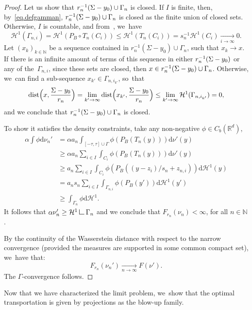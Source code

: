 \documentclass[10pt]{amsart}
\theoremstyle{definition}
\newcommand\LM[1]{\hbox{\vrule width.5pt \vbox to#1pt{\vfill \hrule width#1pt height.5pt}}}
\newcommand\LL{{\mathchoice {\>\LM7\>}{\>\LM7\>}{\,\LM5\,}{\,\LM{3.35}\,}}}
\newcommand{\mres}{\LL}
\newcommand\cH{\mathcal{H}}
\newcommand{\RR}{\mathbb{R}}
\DeclareMathOperator{\dist}{dist}
\newcommand\dd{\mathrm{d}}
\begin{document}
\begin{proof}
Let us show that $r_n^{-1}(\Sigma -\nobreak y_0) \cup\nobreak \Gamma_n$ is closed. If $I$ is finite, then, by~\eqref{eq.defgamman}, $r_n^{-1}(\Sigma -\nobreak y_0) \cup\nobreak \Gamma_n$ is closed as the finite union of closed sets.
Otherwise, $I$ is countable, and from~\cite[Lem.\,2.6]{paolini2013existence}, we~have
\[
\cH^1(\Gamma_{n,i})
=
\cH^1(P_B\circ T_n(C_i))
\le
\cH^1(T_n(C_i))
=
s_n^{-1} \cH^1(C_i)
\xrightarrow[i \to \infty]{} 0.
\]
Let ${\left(x_k\right)}_{k \in \mathbb{N}}$ be a sequence contained in $r_n^{-1}(\Sigma - y_0) \cup \Gamma_n$, such that $x_k \to x$. If there is an infinite amount of terms of this sequence in either $r_n^{-1}(\Sigma -\nobreak y_0)$ or any of the~$\Gamma_{n,i}$, since these sets are closed, then $x \in r_n^{-1}(\Sigma -\nobreak y_0) \cup\nobreak \Gamma_n$. Otherwise, we~can find a sub-sequence $x_{k'} \in \Gamma_{n, i_{k'}}$, so~that
\[
\dist\Bigl(
x, \frac{\Sigma - y_0}{r_n}
\Bigr)
=
\lim_{k' \to \infty}
\dist \Bigl(
x_{k'}, \frac{\Sigma - y_0}{r_n}
\Bigr)
\le
\lim_{k' \to \infty} \cH^1(\Gamma_{n,i_{k'}}) = 0,
\]
and we conclude that $r_n^{-1}(\Sigma -\nobreak y_0) \cup\nobreak \Gamma_n$ is closed.

To show it satisfies the density constraints, take any non-negative $\phi\in C_b(\RR^d)$,
\begin{align*}
\alpha\int\phi\dd \nu_n'
&= \alpha a_n\int_{[-\tau,\tau]\cup \Gamma}\phi\left(P_B(T_n(y))\right)\dd \nu'(y)\\
&\ge \alpha a_n\sum_{i\in I}\int_{C_{i}}\phi\left(P_B(T_n(y))\right)\dd \nu'(y)\\
&\ge a_n\sum_{i\in I}\int_{C_{i}}\phi\left(P_B((y-z_{i})/s_{n}+z_{n,i})\right)\dd \cH^{1}(y)\\
&= a_n s_{n}\sum_{i\in I}\int_{\Gamma_{n,i}}\phi\left(P_B(y')\right)\dd \cH^{1}(y')\\
&
\ge \int_{\Gamma_{n}} \phi \dd \cH^{1}.
\end{align*}
It follows that $\alpha \nu_n'\geq \cH^1\mres \Gamma_{n}$ and we conclude that $F_{r_n}(\nu_n) < \infty$, for all $n \in \mathbb{N}$.

By the continuity of the Wasserstein distance with
respect to the narrow convergence (provided the measures are supported in some common compact set), we~have that:
\[
F_{r_n}(\nu_n') \xrightarrow[n \to \infty]{} F(\nu').
\]
The $\Gamma$-convergence follows.
\end{proof}

Now that we have characterized the limit problem, we~show that the optimal transportation is given by projections as the blow-up family.
\end{document}
